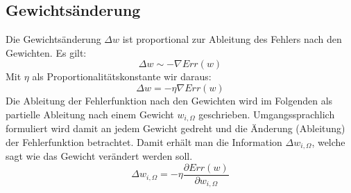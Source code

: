 \subsection*{Gewichtsänderung}
Die Gewichtsänderung $\Delta w$ ist proportional zur Ableitung des Fehlers nach den Gewichten. Es gilt:
\[
	\Delta w \sim - \nabla Err(w)
\]
Mit $\eta$ als Proportionalitätskonstante wir daraus:
\[
	\Delta w = - \eta \nabla Err(w)
\]
Die Ableitung der Fehlerfunktion nach den Gewichten wird im Folgenden als partielle Ableitung nach einem Gewicht $w_{i,\Omega}$ geschrieben. Umgangssprachlich formuliert wird damit an jedem Gewicht gedreht und die Änderung (Ableitung) der Fehlerfunktion betrachtet. Damit erhält man die Information $\Delta w_{i,\Omega}$, welche sagt wie das Gewicht verändert werden soll.
\[
	\Delta w_{i,\Omega} = - \eta \frac{\partial Err(w)}{\partial w_{i,\Omega}}
\]
